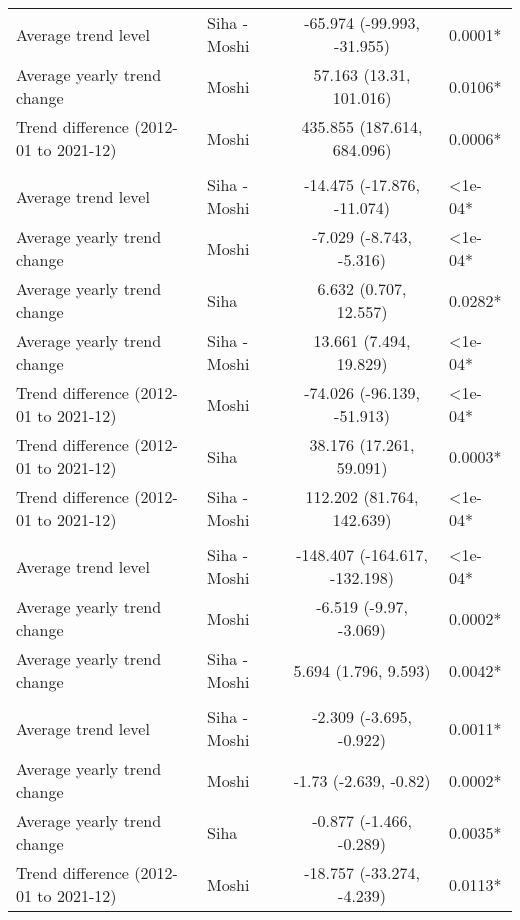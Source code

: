 \begin{longtable}{l|lcl}
\midrule\addlinespace[2.5pt]
\multicolumn{4}{l}{Pneumonia, Severe} \\[2.5pt] 
\midrule\addlinespace[2.5pt]
Average trend level & Siha - Moshi & -65.974 (-99.993, -31.955) & 0.0001* \\ 
Average yearly trend change & Moshi & 57.163 (13.31, 101.016) & 0.0106* \\ 
Trend difference (2012-01 to 2021-12) & Moshi & 435.855 (187.614, 684.096) & 0.0006* \\ 
\midrule\addlinespace[2.5pt]
\multicolumn{4}{l}{Poisoning} \\[2.5pt] 
\midrule\addlinespace[2.5pt]
Average trend level & Siha - Moshi & -14.475 (-17.876, -11.074) & <1e-04* \\ 
Average yearly trend change & Moshi & -7.029 (-8.743, -5.316) & <1e-04* \\ 
Average yearly trend change & Siha & 6.632 (0.707, 12.557) & 0.0282* \\ 
Average yearly trend change & Siha - Moshi & 13.661 (7.494, 19.829) & <1e-04* \\ 
Trend difference (2012-01 to 2021-12) & Moshi & -74.026 (-96.139, -51.913) & <1e-04* \\ 
Trend difference (2012-01 to 2021-12) & Siha & 38.176 (17.261, 59.091) & 0.0003* \\ 
Trend difference (2012-01 to 2021-12) & Siha - Moshi & 112.202 (81.764, 142.639) & <1e-04* \\ 
\midrule\addlinespace[2.5pt]
\multicolumn{4}{l}{Psychoses} \\[2.5pt] 
\midrule\addlinespace[2.5pt]
Average trend level & Siha - Moshi & -148.407 (-164.617, -132.198) & <1e-04* \\ 
Average yearly trend change & Moshi & -6.519 (-9.97, -3.069) & 0.0002* \\ 
Average yearly trend change & Siha - Moshi & 5.694 (1.796, 9.593) & 0.0042* \\ 
\midrule\addlinespace[2.5pt]
\multicolumn{4}{l}{Schistosomiasis} \\[2.5pt] 
\midrule\addlinespace[2.5pt]
Average trend level & Siha - Moshi & -2.309 (-3.695, -0.922) & 0.0011* \\ 
Average yearly trend change & Moshi & -1.73 (-2.639, -0.82) & 0.0002* \\ 
Average yearly trend change & Siha & -0.877 (-1.466, -0.289) & 0.0035* \\ 
Trend difference (2012-01 to 2021-12) & Moshi & -18.757 (-33.274, -4.239) & 0.0113* \\ 

\end{longtable}
